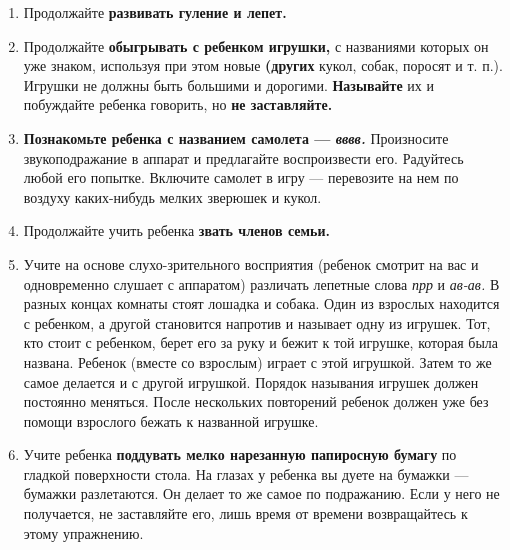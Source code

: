 \documentclass[a5paper]{book}
\renewcommand{\emph}[1]{\textit{#1}}
\begin{document}
\begin{enumerate}
\def\labelenumi{\arabic{enumi}.}
\item
  
  Продолжайте \textbf{развивать гуление и лепет.}
  
\item
  
  Продолжайте \textbf{обыгрывать с ребенком игрушки,} с названиями
  которых он уже знаком, используя при этом новые \textbf{(других}
  кукол, собак, поросят и т. п.). Игрушки не должны быть большими и
  дорогими. \textbf{Называйте} их и побуждайте ребенка говорить, но
  \textbf{не заставляйте.}
  
\item
  
  \textbf{Познакомьте ребенка с названием самолета --- \emph{вввв.
  }}Произносите звукоподражание в аппарат и предлагайте воспроизвести
  его. Радуйтесь любой его попытке. Включите самолет в игру ---
  перевозите на нем по воздуху каких-нибудь мелких зверюшек и кукол.
  
\item
  
  Продолжайте учить ребенка \textbf{звать членов семьи.}
  
\item
  
  Учите на основе слухо-зрительного восприятия (ребенок смотрит на вас и
  одновременно слушает с аппаратом) различать лепетные слова \emph{прр}
  и \emph{ав-ав.} В разных концах комнаты стоят лошадка и собака. Один
  из взрослых находится с ребенком, а другой становится напротив и
  называет одну из игрушек. Тот, кто стоит с ребенком, берет его за руку
  и бежит к той игрушке, которая была названа. Ребенок (вместе со
  взрослым) играет с этой игрушкой. Затем то же самое делается и с
  другой игрушкой. Порядок называния игрушек должен постоянно меняться.
  После нескольких повторений ребенок должен уже без помощи взрослого
  бежать к названной игрушке.
  
\item
  
  Учите ребенка \textbf{поддувать мелко нарезанную папиросную бумагу} по
  гладкой поверхности стола. На глазах у ребенка вы дуете на бумажки ---
  бумажки разлетаются. Он делает то же самое по подражанию. Если у него
  не получается, не заставляйте его, лишь время от времени возвращайтесь
  к этому упражнению.
  
\end{enumerate}
\end{document}
